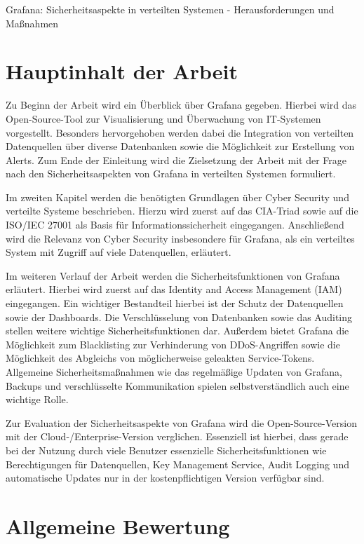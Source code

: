 \documentclass[a4paper,DIV=16]{scrartcl}
\begin{document}
Grafana: Sicherheitsaspekte in verteilten Systemen - Herausforderungen und
Maßnahmen

\section*{Hauptinhalt der Arbeit}
Zu Beginn der Arbeit wird ein Überblick über Grafana gegeben. Hierbei wird das
Open-Source-Tool zur Visualisierung und Überwachung von IT-Systemen vorgestellt.
Besonders hervorgehoben werden dabei die Integration von verteilten Datenquellen
über diverse Datenbanken sowie die Möglichkeit zur Erstellung von Alerts. Zum
Ende der Einleitung wird die Zielsetzung der Arbeit mit der Frage nach den
Sicherheitsaspekten von Grafana in verteilten Systemen formuliert.

Im zweiten Kapitel werden die benötigten Grundlagen über Cyber Security und
verteilte Systeme beschrieben. Hierzu wird zuerst auf das CIA-Triad sowie auf
die ISO/IEC 27001 als Basis für Informationssicherheit eingegangen. Anschließend
wird die Relevanz von Cyber Security insbesondere für Grafana, als ein
verteiltes System mit Zugriff auf viele Datenquellen, erläutert.

Im weiteren Verlauf der Arbeit werden die Sicherheitsfunktionen von Grafana
erläutert. Hierbei wird zuerst auf das Identity and Access Management (IAM)
eingegangen. Ein wichtiger Bestandteil hierbei ist der Schutz der Datenquellen
sowie der Dashboards. Die Verschlüsselung von Datenbanken sowie das Auditing
stellen weitere wichtige Sicherheitsfunktionen dar. Außerdem bietet Grafana die
Möglichkeit zum Blacklisting zur Verhinderung von DDoS-Angriffen sowie die
Möglichkeit des Abgleichs von möglicherweise geleakten Service-Tokens.
Allgemeine Sicherheitsmaßnahmen wie das regelmäßige Updaten von Grafana, Backups
und verschlüsselte Kommunikation spielen selbstverständlich auch eine wichtige
Rolle.

Zur Evaluation der Sicherheitsaspekte von Grafana wird die Open-Source-Version
mit der Cloud-/Enterprise-Version verglichen. Essenziell ist hierbei, dass
gerade bei der Nutzung durch viele Benutzer essenzielle  Sicherheitsfunktionen
wie Berechtigungen für Datenquellen, Key Management Service, Audit Logging und
automatische Updates nur in der kostenpflichtigen Version verfügbar sind.

\section*{Allgemeine Bewertung}
\end{document}
